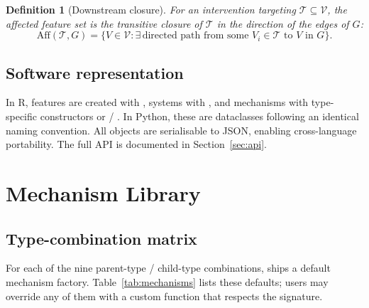 \documentclass[article]{jss}
\newtheorem{definition}{Definition}
\begin{document}
\begin{definition}[Downstream closure]
For an intervention targeting $\mathcal{T} \subseteq \mathcal{V}$, the \emph{affected feature set} is the transitive closure of $\mathcal{T}$ in the direction of the edges of $G$:
\[
\text{Aff}(\mathcal{T}, G) = \{V \in \mathcal{V} : \exists\, \text{directed path from some } V_i \in \mathcal{T} \text{ to } V \text{ in } G\}.
\]
\end{definition}

\subsection{Software representation}

In R, features are created with , systems with , and mechanisms with type-specific constructors or  / . In Python, these are dataclasses following an identical naming convention. All objects are serialisable to JSON, enabling cross-language portability. The full API is documented in Section~\ref{sec:api}.

\section{Mechanism Library}
\label{sec:mechanisms}

\subsection{Type-combination matrix}

For each of the nine parent-type / child-type combinations,  ships a default mechanism factory. Table~\ref{tab:mechanisms} lists these defaults; users may override any of them with a custom function that respects the  signature.
\end{document}
